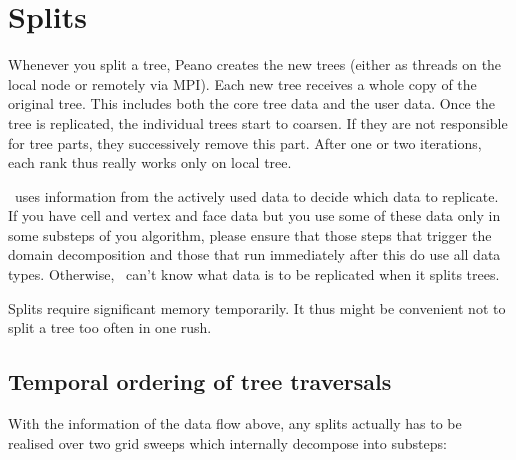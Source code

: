 \section{Splits}

Whenever you split a tree, Peano creates the new trees (either as threads on
the local node or remotely via MPI). 
Each new tree receives a whole copy of the original tree. 
This includes both the core tree data and the user data.
Once the tree is replicated, the individual trees start to coarsen.
If they are not responsible for tree parts, they successively remove this part. 
After one or two iterations, each rank thus really works only on local tree.


\begin{remark}
 \Peano\ uses information from the actively used data to decide which data to
 replicate.
 If you have cell and vertex and face data but you use some of these data only
 in some substeps of you algorithm, please ensure that those steps that trigger
 the domain decomposition and those that run immediately after this do use all
 data types.
 Otherwise, \Peano\ can't know what data is to be replicated when it splits
 trees.
\end{remark}

\begin{remark}
 Splits require significant memory temporarily. It thus might be convenient not
 to split a tree too often in one rush.
\end{remark}


\subsection{Temporal ordering of tree traversals}

With the information of the data flow above, any splits actually has to be
realised over two grid sweeps which internally decompose into substeps:

